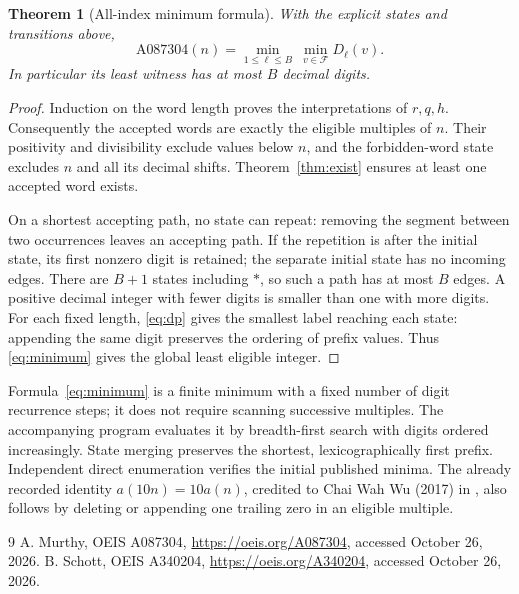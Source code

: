 \documentclass[10pt]{article}
\newtheorem{theorem}{Theorem}
\begin{document}
\begin{theorem}[All-index minimum formula]\label{thm:min}
With the explicit states and transitions above,
\begin{equation}\label{eq:minimum}
 \mathrm{A087304}(n)=\min_{1\le\ell\le B}\ \min_{v\in\mathcal F}D_\ell(v).
\end{equation}
In particular its least witness has at most $B$ decimal digits.
\end{theorem}
\begin{proof}
Induction on the word length proves the interpretations of $r,q,h$.
Consequently the accepted words are exactly the eligible multiples of
$n$. Their positivity and divisibility exclude values below $n$, and
the forbidden-word state excludes $n$ and all its decimal shifts.
Theorem~\ref{thm:exist} ensures at least one accepted word exists.

On a shortest accepting path, no state can repeat: removing the segment
between two occurrences leaves an accepting path. If the repetition is
after the initial state, its first nonzero digit is retained; the separate
initial state has no incoming edges. There are $B+1$ states including
$*$, so such a path has at most $B$ edges. A positive decimal integer
with fewer digits is smaller than one with more digits. For each fixed
length, \eqref{eq:dp} gives the smallest label reaching each state:
appending the same digit preserves the ordering of prefix values.
Thus \eqref{eq:minimum} gives the global least eligible integer.
\end{proof}

Formula~\eqref{eq:minimum} is a finite minimum with a fixed number of digit
recurrence steps; it does not require scanning successive multiples.
The accompanying program evaluates it by breadth-first search with
digits ordered increasingly. State merging preserves the shortest,
lexicographically first prefix. Independent direct enumeration verifies
the initial published minima. The already recorded identity
$a(10n)=10a(n)$, credited to Chai Wah Wu (2017) in \cite{oeis}, also follows
by deleting or appending one trailing zero in an eligible multiple.

\begin{thebibliography}{9}
 A. Murthy, OEIS A087304,
\url{https://oeis.org/A087304}, accessed October 26, 2026.
 B. Schott, OEIS A340204,
\url{https://oeis.org/A340204}, accessed October 26, 2026.
\end{thebibliography}
\end{document}
